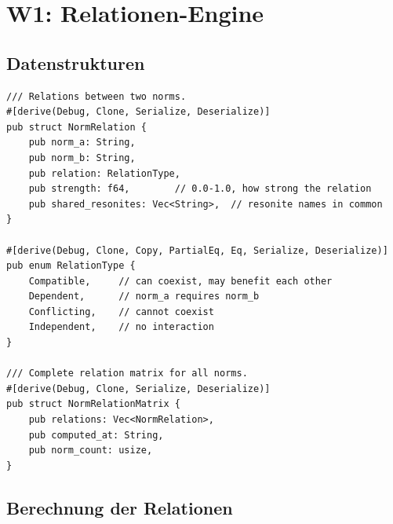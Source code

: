 \documentclass[11pt,a4paper]{article}
\begin{document}
\section{W1: Relationen-Engine}
\label{sec:w1}

\subsection{Datenstrukturen}

\begin{lstlisting}[style=rust]
/// Relations between two norms.
#[derive(Debug, Clone, Serialize, Deserialize)]
pub struct NormRelation {
    pub norm_a: String,
    pub norm_b: String,
    pub relation: RelationType,
    pub strength: f64,        // 0.0-1.0, how strong the relation
    pub shared_resonites: Vec<String>,  // resonite names in common
}

#[derive(Debug, Clone, Copy, PartialEq, Eq, Serialize, Deserialize)]
pub enum RelationType {
    Compatible,     // can coexist, may benefit each other
    Dependent,      // norm_a requires norm_b
    Conflicting,    // cannot coexist
    Independent,    // no interaction
}

/// Complete relation matrix for all norms.
#[derive(Debug, Clone, Serialize, Deserialize)]
pub struct NormRelationMatrix {
    pub relations: Vec<NormRelation>,
    pub computed_at: String,
    pub norm_count: usize,
}
\end{lstlisting}

\subsection{Berechnung der Relationen}
\end{document}
